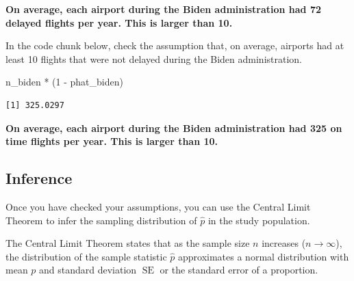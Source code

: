 \documentclass[
  letterpaper,
  DIV=11,
  numbers=noendperiod]{scrartcl}
\newenvironment{Shaded}{\begin{snugshade}}{\end{snugshade}}
\newcommand{\DecValTok}[1]{\textcolor[rgb]{0.68,0.00,0.00}{#1}}
\newcommand{\NormalTok}[1]{\textcolor[rgb]{0.00,0.23,0.31}{#1}}
\newcommand{\SpecialCharTok}[1]{\textcolor[rgb]{0.37,0.37,0.37}{#1}}
\begin{document}
\begin{tcolorbox}[enhanced jigsaw, toprule=.15mm, breakable, leftrule=.75mm, bottomrule=.15mm, rightrule=.15mm, colback=white, opacityback=0, colframe=quarto-callout-warning-color-frame, left=2mm, arc=.35mm]

\textbf{On average, each airport during the Biden administration had 72
delayed flights per year. This is larger than 10.}

\end{tcolorbox}

In the code chunk below, check the assumption that, on average, airports
had at least 10 flights that were not delayed during the Biden
administration.

\begin{Shaded}
\begin{Highlighting}[]
\NormalTok{n\_biden }\SpecialCharTok{*}\NormalTok{ (}\DecValTok{1} \SpecialCharTok{{-}}\NormalTok{ phat\_biden)}
\end{Highlighting}
\end{Shaded}

\begin{verbatim}
[1] 325.0297
\end{verbatim}

\begin{tcolorbox}[enhanced jigsaw, toprule=.15mm, breakable, leftrule=.75mm, bottomrule=.15mm, rightrule=.15mm, colback=white, opacityback=0, colframe=quarto-callout-warning-color-frame, left=2mm, arc=.35mm]

\textbf{On average, each airport during the Biden administration had 325
on time flights per year. This is larger than 10.}

\end{tcolorbox}

\subsection{Inference}\label{inference}

Once you have checked your assumptions, you can use the Central Limit
Theorem to infer the sampling distribution of \(\hat{p}\) in the study
population.

The Central Limit Theorem states that as the sample size \(n\) increases
(\(n \to \infty\)), the distribution of the sample statistic \(\hat{p}\)
approximates a normal distribution with mean \(p\) and standard
deviation \(\operatorname{SE}\) or the standard error of a proportion.
\end{document}
